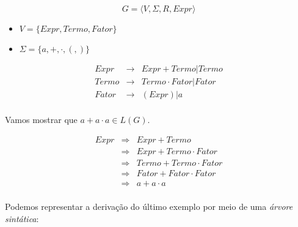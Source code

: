 \begin{example}
  \begin{displaymath}
    G = \langle V, \Sigma, R, Expr \rangle
  \end{displaymath}
  \begin{itemize}
  \item $V = \{Expr, Termo, Fator\}$
  \item $\Sigma = \{a, +, \cdot, (,)\}$
  \end{itemize}


  \begin{eqnarray*}
    Expr &\to& Expr  +  Termo |  Termo \\
    Termo &\to& Termo \cdot Fator |  Fator \\
    Fator &\to& ( Expr ) | a \\
  \end{eqnarray*}

Vamos mostrar que $a + a \cdot a \in L(G)$.

\begin{eqnarray*}
  Expr  & \Rightarrow &  Expr  +  Termo  \\
  & \Rightarrow &  Expr  +  Termo  \cdot  Fator \\
  & \Rightarrow &  Termo  +  Termo  \cdot  Fator \\
  & \Rightarrow &  Fator  +  Fator  \cdot  Fator \\
  & \Rightarrow & a + a \cdot a\\
\end{eqnarray*}
\end{example}

Podemos representar a derivação do último exemplo por meio de uma {\em árvore sintática}:

\begin{center}
\end{center}


